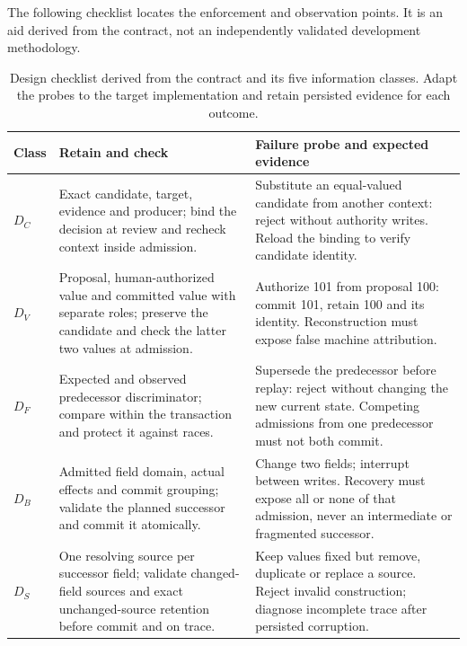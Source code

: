 \documentclass[11pt,a4paper]{article}
\begin{document}
The following checklist locates the enforcement and observation points. It is an aid derived from the contract, not an independently validated development methodology.
\begin{table}[!htbp]
\centering
\caption{Design checklist derived from the contract and its five information classes. Adapt the probes to the target implementation and retain persisted evidence for each outcome.}
\label{tab:design-checklist}
\begin{tabularx}{\textwidth}{@{}l>{\raggedright\arraybackslash}p{}>{\raggedright\arraybackslash}X@{}}
\toprule
Class & Retain and check & Failure probe and expected evidence \\
\midrule
$D_C$ & Exact candidate, target, evidence and producer; bind the decision at review and recheck context inside admission. & Substitute an equal-valued candidate from another context: reject without authority writes. Reload the binding to verify candidate identity. \\
\addlinespace
$D_V$ & Proposal, human-authorized value and committed value with separate roles; preserve the candidate and check the latter two values at admission. & Authorize 101 from proposal 100: commit 101, retain 100 and its identity. Reconstruction must expose false machine attribution. \\
\addlinespace
$D_F$ & Expected and observed predecessor discriminator; compare within the transaction and protect it against races. & Supersede the predecessor before replay: reject without changing the new current state. Competing admissions from one predecessor must not both commit. \\
\addlinespace
$D_B$ & Admitted field domain, actual effects and commit grouping; validate the planned successor and commit it atomically. & Change two fields; interrupt between writes. Recovery must expose all or none of that admission, never an intermediate or fragmented successor. \\
\addlinespace
$D_S$ & One resolving source per successor field; validate changed-field sources and exact unchanged-source retention before commit and on trace. & Keep values fixed but remove, duplicate or replace a source. Reject invalid construction; diagnose incomplete trace after persisted corruption. \\
\bottomrule
\end{tabularx}
\end{table}
\end{document}
